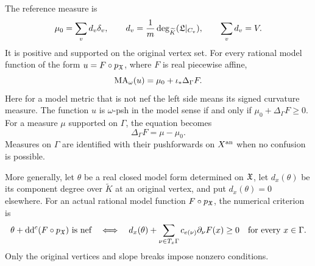 \begin{lemma}
\label{lem:ch31-curve-ma-affine}
The reference measure is
\[
 \mu_0=\sum_v d_v\delta_v,\qquad
 d_v=\frac1m\deg_{\widetilde K}(\mathfrak L|_{C_v}),\qquad
 \sum_vd_v=V.
\]
It is positive and supported on the original vertex set.
For every rational model function of the form
\(u=F\circ p_{\mathfrak X}\), where \(F\) is real piecewise affine,
\begin{equation}
\label{eq:curve-ma-laplacian}
                 \operatorname{MA}_\omega(u)=\mu_0+\iota_*\Delta_\Gamma F.
\end{equation}
Here for a model metric that is not nef the left side means its signed
curvature measure.  The function \(u\) is \(\omega\)-psh in the
model sense if and only if \(\mu_0+\Delta_\Gamma F\geq0\).
For a measure \(\mu\) supported on \(\Gamma\), the equation becomes
\begin{equation}
\label{eq:curve-poisson}
                      \Delta_\Gamma F=\mu-\mu_0 .
\end{equation}
Measures on \(\Gamma\) are identified with their pushforwards on
\(X^{\mathrm{an}}\) when no confusion is possible.

More generally, let \(\theta\) be a real closed model form determined
on \(\mathfrak X\), let \(d_x(\theta)\) be its component degree over
\(\widetilde K\) at an original vertex, and put \(d_x(\theta)=0\)
elsewhere.  For an actual rational model function
\(F\circ p_{\mathfrak X}\), the numerical criterion is
\begin{equation}
\label{eq:curve-slope-criterion}
 \theta+\mathrm d\mathrm d^c(F\circ p_{\mathfrak X})\text{ is nef}
 \quad\Longleftrightarrow\quad
 d_x(\theta)+\sum_{\nu\in T_x\Gamma}
       c_{e(\nu)}\partial_\nu F(x)\geq0
 \quad\text{for every }x\in\Gamma.
\end{equation}
Only the original vertices and slope breaks impose nonzero conditions.
\end{lemma}

